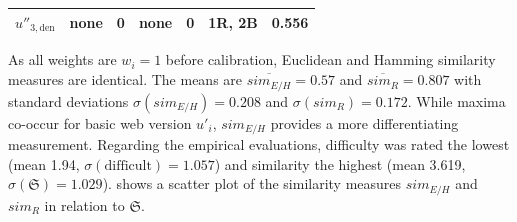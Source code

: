 \begin{longtable}[]{@{}lllllll@{}}
\begin{minipage}[t]{0.13\columnwidth}
\(u''_{3,\text{den}}\)\strut
\end{minipage} & \begin{minipage}[t]{0.10\columnwidth}\raggedright
none\strut
\end{minipage} & \begin{minipage}[t]{0.15\columnwidth}\raggedright
0\strut
\end{minipage} & \begin{minipage}[t]{0.06\columnwidth}\raggedright
none\strut
\end{minipage} & \begin{minipage}[t]{0.15\columnwidth}\raggedright
0\strut
\end{minipage} & \begin{minipage}[t]{0.07\columnwidth}\raggedright
1R, 2B\strut
\end{minipage} & \begin{minipage}[t]{0.15\columnwidth}\raggedright
0.556\strut
\end{minipage}\tabularnewline
\bottomrule
\end{longtable}

As all weights are \(w_i=1\) before calibration, Euclidean and Hamming similarity measures are identical.
The means are \(\overline{sim_{E/H}}=0.57\) and \(\overline{sim_R}=0.807\) with standard deviations \(\sigma(sim_{E/H})=0.208\) and \(\sigma(sim_R)=0.172\).
While maxima co-occur for basic web version \(u'_i\), \(sim_{E/H}\) provides a more differentiating measurement.
Regarding the empirical evaluations, difficulty was rated the lowest (mean 1.94, \(\sigma(\text{difficult})=1.057\)) and similarity the highest (mean 3.619, \(\sigma(\mathfrak{S})=1.029\)).
 shows a scatter plot of the similarity measures \(sim_{E/H}\) and \(sim_R\) in relation to \(\mathfrak{S}\).

